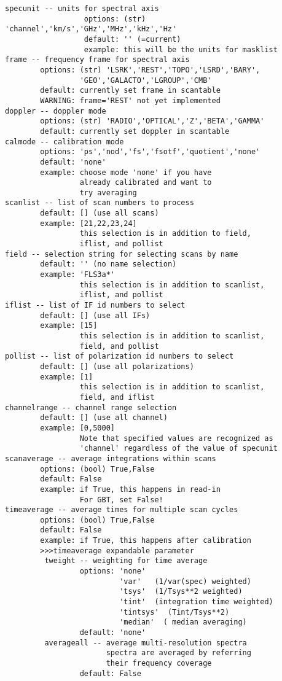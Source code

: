 \begin{verbatim}
specunit -- units for spectral axis
                  options: (str) 'channel','km/s','GHz','MHz','kHz','Hz'
                  default: '' (=current)
                  example: this will be the units for masklist
frame -- frequency frame for spectral axis
        options: (str) 'LSRK','REST','TOPO','LSRD','BARY',
                 'GEO','GALACTO','LGROUP','CMB'
        default: currently set frame in scantable
        WARNING: frame='REST' not yet implemented    
doppler -- doppler mode
        options: (str) 'RADIO','OPTICAL','Z','BETA','GAMMA'
        default: currently set doppler in scantable
calmode -- calibration mode
        options: 'ps','nod','fs','fsotf','quotient','none'
        default: 'none'
        example: choose mode 'none' if you have
                 already calibrated and want to
                 try averaging
scanlist -- list of scan numbers to process
        default: [] (use all scans)
        example: [21,22,23,24]
                 this selection is in addition to field,
                 iflist, and pollist
field -- selection string for selecting scans by name
        default: '' (no name selection)
        example: 'FLS3a*'
                 this selection is in addition to scanlist,
                 iflist, and pollist
iflist -- list of IF id numbers to select
        default: [] (use all IFs)
        example: [15]
                 this selection is in addition to scanlist,
                 field, and pollist
pollist -- list of polarization id numbers to select
        default: [] (use all polarizations)
        example: [1]
                 this selection is in addition to scanlist,
                 field, and iflist
channelrange -- channel range selection
        default: [] (use all channel)
        example: [0,5000]
                 Note that specified values are recognized as
                 'channel' regardless of the value of specunit
scanaverage -- average integrations within scans
        options: (bool) True,False
        default: False
        example: if True, this happens in read-in
                 For GBT, set False!
timeaverage -- average times for multiple scan cycles
        options: (bool) True,False
        default: False
        example: if True, this happens after calibration
        >>>timeaverage expandable parameter
         tweight -- weighting for time average
                 options: 'none'
                          'var'   (1/var(spec) weighted)
                          'tsys'  (1/Tsys**2 weighted)
                          'tint'  (integration time weighted)
                          'tintsys'  (Tint/Tsys**2)
                          'median'  ( median averaging)
                 default: 'none'
         averageall -- average multi-resolution spectra
                       spectra are averaged by referring
                       their frequency coverage
                 default: False


\end{verbatim}
